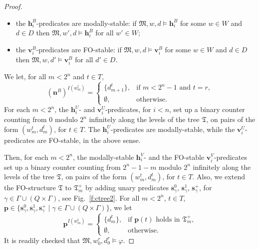 \documentclass[10pt,a4paper]{amsart}
\theoremstyle{plain}
\theoremstyle{definition}
\newcommand{\fform}[1]{\boldsymbol{#1}}
\newcommand{\pvar}{\fform{p}}
\newcommand{\svar}{\fform{s}}
\newcommand{\hvar}{\fform{h}}
\newcommand{\vvar}{\fform{v}}
\newcommand{\cR}{B}
\newcommand{\cU}{U}
\newcommand{\cV}{V}
\newcommand{\nextR}{\fform{n}^\cR}
\newcommand{\treemod}{\mathfrak T}
\newcommand{\treedom}{T}
\newcommand{\treet}{t}
\begin{document}
\begin{proof}
\begin{itemize}
			\item[--]
			the $\hvar^\cR_i$-predicates are modally-stable:  if $\mathfrak M,w,d\models\hvar^\cR_i$ for some
			$w\in W$ and $d\in D$ then
			$\mathfrak M,w',d\models\hvar^\cR_i$ for all $w'\in W$;
			
			\item[--]
			the $\vvar^\cR_i$-predicates are FO-stable:  if $\mathfrak M,w,d\models\vvar^\cR_i$ for some
			$w\in W$ and $d\in D$ then
			$\mathfrak M,w,d'\models\vvar^\cR_i$ for all $d'\in D$.
		\end{itemize}
		We let, for all $m<2^n$ and $\treet\in\treedom$,
		\[
		( \nextR)^{I(w_m^\treet)}  = \left\{
		\begin{array}{ll}
			\{d_{m+1}^{\treet}\}, & \mbox{if $m<2^n\mathop{-}1$ and $\treet=r$,}\\[3pt]
			\emptyset, &\mbox{otherwise.}
		\end{array}
		\right.
		\]
		For each $m<2^n$, the $\hvar^\cU_i$- and $\vvar^\cU_i$-predicates, for $i<n$, set up a binary counter counting from $0$ modulo $2^n$ infinitely along the levels of the tree $\treemod$, on pairs of the form $(w_m^t,d_m^t)$, for $t\in\treedom$. The $\hvar^\cU_i$-predicates are modally-stable, while the $\vvar^\cU_i$-predicates are FO-stable, in the above sense.
		



		Then, for each $m<2^n$, the modally-stable $\hvar^\cV_i$- and the FO-stable $\vvar^\cV_i$-predicates set up a binary counter counting from $2^n-1-m$ modulo $2^n$ infinitely along the levels of the tree $\treemod$, on pairs of the form $(w_m^t,d_m^t)$, for $t\in\treedom$. Also,
		we extend the FO-structure $\treemod$ to $\treemod_m^+$ by adding 
		unary predicates
		$\svar_\gamma^0$, $\svar_\gamma^1$, $\svar_\gamma^+$, for $\gamma\in\Gamma\cup(Q\times\Gamma)$, see Fig.~\ref{f:ctree2}. 
		For all $m<2^n$, 
		$\treet\in\treedom$, $\pvar\in\{\svar_\gamma^0,\svar_\gamma^1,\svar_\gamma^+\mid \gamma\in\Gamma\cup(Q\times\Gamma)\}$, we let 
		\[
		\pvar^{I(w_m^\treet)}  = \left\{
		\begin{array}{ll}
			\{d_m^{\treet}\},  & \mbox{if $\pvar(\treet)$ holds in $\treemod_m^+$,}\\[3pt]
			\emptyset, &\mbox{otherwise.}
		\end{array}
		\right.
		\]
		It is readily checked that $\mathfrak M,w_0^r,d_0^r\models\varphi$. 
		

\end{proof}
\end{document}
